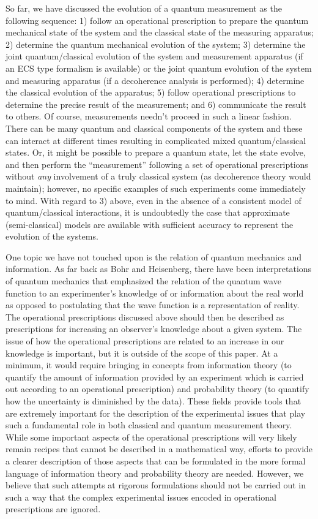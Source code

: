 \documentclass [12pt]{revtex4}
\begin{document}
So far, we have discussed the evolution of a quantum measurement as
the following sequence: 1) follow an operational prescription to
prepare the quantum mechanical state of the system and the classical
state of the measuring apparatus; 2) determine the quantum
mechanical evolution of the system; 3) determine the joint
quantum/classical evolution of the system and measurement apparatus
(if an ECS type formalism is available) or the joint quantum evolution
of the system and measuring apparatus (if a decoherence analysis is
performed); 4) determine the classical evolution of the apparatus; 5) follow
operational prescriptions to determine the {precise} result of
the measurement; and 6) communicate the result to others. Of course,
measurements needn't proceed in such a linear fashion. There can be
many quantum and classical components of the system and these can
interact at different times resulting in complicated mixed
quantum/classical states. Or, it might be possible to prepare a
quantum state, let the state evolve, and then perform the
``measurement'' following a set of operational prescriptions without
{\it any} involvement of a truly classical system (as decoherence theory
would maintain); however, no specific examples of such experiments come
immediately to mind.  With regard to 3) above, even in the absence of
a consistent model of quantum/classical interactions, it is undoubtedly the
case that approximate (semi-classical) models are available with sufficient accuracy to
represent the evolution of the systems.

One topic we have not touched upon is the relation of quantum mechanics and information.
As far back as Bohr and Heisenberg, there have been interpretations of quantum mechanics
that emphasized the relation of the quantum wave function to an experimenter's knowledge
of or information about the real world as opposed to postulating that the wave function
is a representation of reality. The operational prescriptions discussed above should then
be described as prescriptions for increasing an observer's knowledge about a given system.
The issue of how the operational prescriptions are related to an increase in our knowledge
is important, but it is outside of the scope of this paper. At a minimum, it would require
bringing in concepts from information theory (to quantify the amount of information provided
by an experiment which is carried out according to an operational prescription) and probability
theory (to quantify how the uncertainty is diminished by the data). These fields provide tools
that are extremely important for the description of the experimental issues that play such a
fundamental role in both classical and quantum measurement theory. While some important aspects
of the operational prescriptions will very likely remain recipes that cannot be described in a
mathematical way, efforts to provide a clearer description of those aspects that can be formulated
in the more formal language of information theory and probability theory are needed. However, we believe that such attempts at rigorous formulations should not be carried out in such a way
that the complex experimental issues encoded in operational prescriptions are ignored.
\end{document}
